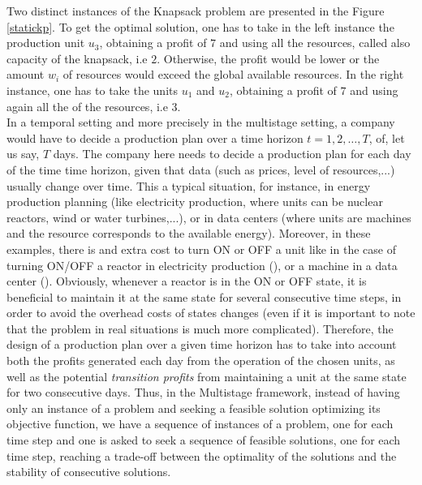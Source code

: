 \documentclass[a4paper]{book}
\begin{document}
Two distinct instances of the {\sc Knapsack} problem are presented in the Figure \ref{statickp}. To get the optimal solution, one has to take in the left instance the production unit $u_3$, obtaining a profit of $7$ and using all the resources, called also capacity of the knapsack, i.e $2$. Otherwise, the profit would be lower or the amount $w_i$ of resources would exceed the global available resources. In the right instance, one has to take the units $u_1$ and $u_2$, obtaining a profit of $7$ and using again all the of the resources, i.e $3$.\\

In a temporal setting and more precisely in the multistage setting, a company would have to decide a production plan over a time horizon $t=1,2,\ldots, T$, of, let us say, $T$ days. The company here needs to decide a production plan for each day of the time time horizon, given that data (such as prices, level of resources,...) usually change over time. This a typical situation, for instance, in energy production planning (like electricity production, where units can be nuclear reactors, wind or water turbines,...), or in data centers (where units are machines and the resource corresponds to the available energy). Moreover, in these examples, there is and extra cost to turn ON or OFF a unit like in the case of turning ON/OFF a reactor in electricity production (\cite{rottner2018combinatorial}), or a machine in a data center (\cite{DBLP:conf/spaa/2017}). Obviously, whenever a reactor is in the ON or OFF state, it is beneficial to maintain it at the same state for several consecutive time steps, in order to avoid the overhead costs of states changes (even if it is important to note that the problem in real situations is much more complicated). Therefore, the design of a production plan over a given time horizon has to take into account both the profits generated each day from the operation of the chosen units, as well as the potential \textit{transition profits} from maintaining a unit at the same state for two consecutive days. Thus, in the {\sc Multistage} framework, instead of having only an instance of a problem and seeking a feasible solution optimizing its objective function, we have a sequence of instances of a problem, one for each time step and one is asked to seek a sequence of feasible solutions, one for each time step, reaching a trade-off between the optimality of the solutions and the stability of consecutive solutions.\\
\end{document}
